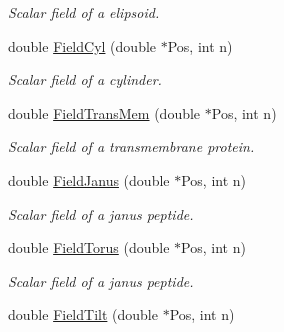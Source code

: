 \begin{DoxyCompactItemize}
\begin{DoxyCompactList}\small\item\em \-Scalar field of a elipsoid. \end{DoxyCompactList}\item 
\hypertarget{classVarData_acd3ad67b85fda45f9aee58a45d7391f9}{double \hyperlink{classVarData_acd3ad67b85fda45f9aee58a45d7391f9}{\-Field\-Cyl} (double $\ast$\-Pos, int n)}\label{classVarData_acd3ad67b85fda45f9aee58a45d7391f9}

\begin{DoxyCompactList}\small\item\em \-Scalar field of a cylinder. \end{DoxyCompactList}\item 
\hypertarget{classVarData_a9d9191dee4d541b9879c24a00fd0a834}{double \hyperlink{classVarData_a9d9191dee4d541b9879c24a00fd0a834}{\-Field\-Trans\-Mem} (double $\ast$\-Pos, int n)}\label{classVarData_a9d9191dee4d541b9879c24a00fd0a834}

\begin{DoxyCompactList}\small\item\em \-Scalar field of a transmembrane protein. \end{DoxyCompactList}\item 
\hypertarget{classVarData_a46e51009369b146f3a742f86e5161ddf}{double \hyperlink{classVarData_a46e51009369b146f3a742f86e5161ddf}{\-Field\-Janus} (double $\ast$\-Pos, int n)}\label{classVarData_a46e51009369b146f3a742f86e5161ddf}

\begin{DoxyCompactList}\small\item\em \-Scalar field of a janus peptide. \end{DoxyCompactList}\item 
\hypertarget{classVarData_aa4f434e91f7eb95a1367c12d0bccf2b4}{double \hyperlink{classVarData_aa4f434e91f7eb95a1367c12d0bccf2b4}{\-Field\-Torus} (double $\ast$\-Pos, int n)}\label{classVarData_aa4f434e91f7eb95a1367c12d0bccf2b4}

\begin{DoxyCompactList}\small\item\em \-Scalar field of a janus peptide. \end{DoxyCompactList}\item 
\hypertarget{classVarData_acf4dca72902c52130df7a72568b038d7}{double \hyperlink{classVarData_acf4dca72902c52130df7a72568b038d7}{\-Field\-Tilt} (double $\ast$\-Pos, int n)}\label{classVarData_acf4dca72902c52130df7a72568b038d7}


\end{DoxyCompactItemize}
